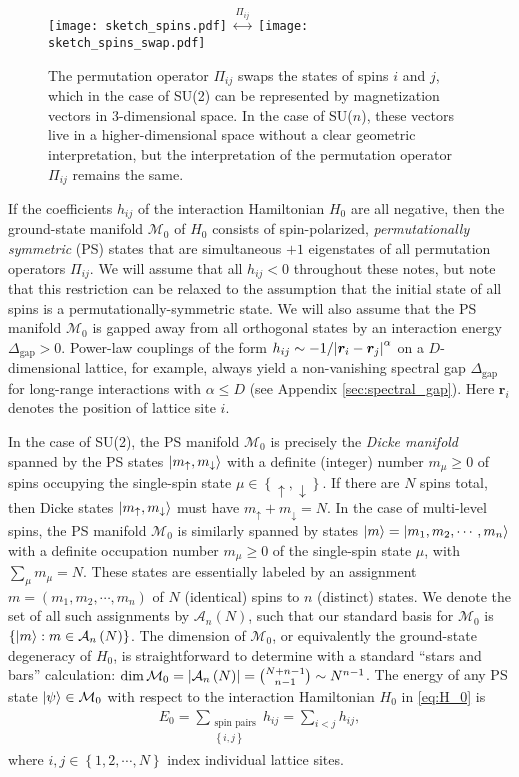 \documentclass[nofootinbib,notitlepage,11pt]{revtex4-2}
\renewcommand{\t}{\text} %
\newcommand{\p}[1]{\left(#1\right)} %
\renewcommand{\set}[1]{\left\{#1\right\}} %
\newcommand{\m}{\bm} %
\newcommand{\1}{\mathds{1}}
\newcommand{\up}{\uparrow}
\newcommand{\dn}{\downarrow}
\newcommand{\A}{\mathcal{A}}
\newcommand{\M}{\mathcal{M}}
\begin{document}
\begin{figure}
  \centering
  \texttt{[image: sketch\_spins.pdf]}
  $\stackrel{\displaystyle\Pi_{ij}}
  {\displaystyle\longleftrightarrow}$
  \texttt{[image: sketch\_spins\_swap.pdf]}
  \caption{The permutation operator $\Pi_{ij}$ swaps the states of
    spins $i$ and $j$, which in the case of SU(2) can be represented
    by magnetization vectors in 3-dimensional space.  In the case of
    SU($n$), these vectors live in a higher-dimensional space without
    a clear geometric interpretation, but the interpretation of the
    permutation operator $\Pi_{ij}$ remains the same.}
  \label{fig:sketch_spins}
\end{figure}

If the coefficients $h_{ij}$ of the interaction Hamiltonian $H_0$ are
all negative, then the ground-state manifold $\M_0$ of $H_0$ consists
of spin-polarized, {\it permutationally symmetric} (PS) states that
are simultaneous $+1$ eigenstates of all permutation operators
$\Pi_{ij}$.  We will assume that all $h_{ij}<0$ throughout these
notes, but note that this restriction can be relaxed to the assumption
that the initial state of all spins is a permutationally-symmetric
state.  We will also assume that the PS manifold $\M_0$ is gapped away
from all orthogonal states by an interaction energy
$\Delta_{\t{gap}}>0$.  Power-law couplings of the form
$h_{ij}\sim-1/\abs{\m r_i-\m r_j}^\alpha$ on a $D$-dimensional
lattice, for example, always yield a non-vanishing spectral gap
$\Delta_{\t{gap}}$ for long-range interactions with $\alpha\le D$ (see
Appendix \ref{sec:spectral_gap}).  Here $\m r_i$ denotes the position
of lattice site $i$.

In the case of SU(2), the PS manifold $\M_0$ is precisely the {\it
  Dicke manifold} spanned by the PS states $\ket{m_\up,m_\dn}$ with a
definite (integer) number $m_\mu\ge0$ of spins occupying the
single-spin state $\mu\in\set{\up,\dn}$.  If there are $N$ spins
total, then Dicke states $\ket{m_\up,m_\dn}$ must have
$m_\up+m_\dn=N$.  In the case of multi-level spins, the PS manifold
$\M_0$ is similarly spanned by states
$\ket{m}=\ket{m_1,m_2,\cdots,m_n}$ with a definite occupation number
$m_\mu\ge0$ of the single-spin state $\mu$, with $\sum_\mu m_\mu=N$.
These states are essentially labeled by an assignment
$m=\p{m_1,m_2,\cdots,m_n}$ of $N$ (identical) spins to $n$ (distinct)
states.  We denote the set of all such assignments by $\A_n\p{N}$,
such that our standard basis for $\M_0$ is
$\set{\ket{m}:m\in\A_n\p{N}}$.  The dimension of $\M_0$, or
equivalently the ground-state degeneracy of $H_0$, is straightforward
to determine with a standard ``stars and bars'' calculation:
$\dim\M_0=\abs{\A_n\p{N}} = {N+n-1 \choose n-1} \sim N^{n-1}$.  The
energy of any PS state $\ket\psi\in\M_0$ with respect to the
interaction Hamiltonian $H_0$ in \eqref{eq:H_0} is
\begin{align}
  E_0 = \sum_{\substack{\t{spin pairs}\\\set{i,j}}} h_{ij}
  = \sum_{i<j} h_{ij},
\end{align}
where $i,j\in\set{1,2,\cdots,N}$ index individual lattice sites.
\end{document}
